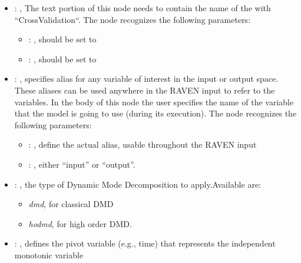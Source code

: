 \begin{itemize}
    \item {}: , 
      The text portion of this node needs to contain the name of the  with
               ``CrossValidation``.
      The  node recognizes the following parameters:
        \begin{itemize}
          \item {}: , 
            should be set to 
          \item {}: , 
            should be set to 
      \end{itemize}

    \item {}: , 
      specifies alias for         any variable of interest in the input or output space. These
      aliases can be used anywhere in the RAVEN input to         refer to the variables. In the body
      of this node the user specifies the name of the variable that the model is going to use
      (during its execution).
      The  node recognizes the following parameters:
        \begin{itemize}
          \item {}: , 
            define the actual alias, usable throughout the RAVEN input
          \item {}: , 
            either ``input'' or ``output''.
      \end{itemize}

    \item {}: , 
      the type of Dynamic Mode Decomposition to apply.Available are:
      \begin{itemize}                                                     \item \textit{dmd}, for
      classical DMD                                                     \item \textit{hodmd}, for
      high order DMD.                                                   \end{itemize}

    \item {}: , 
      defines the pivot variable (e.g., time) that represents the
      independent monotonic variable


\end{itemize}
